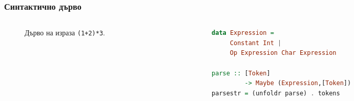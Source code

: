 \documentclass{beamer}
\begin{document}
\begin{frame}[fragile]
  \frametitle{Синтактично дърво}


\begin{columns}[t]
  \begin{column}{0.3\textwidth}

    \begin{figure}
      \centering
      \caption{Дърво на израза \texttt{(1+2)*3}.}
      \label{fig:treeexpr}
      \end{figure}
      

  \end{column}
  \begin{column}{0.7\textwidth}

\begin{lstlisting}[basicstyle=\small,language=Haskell]
data Expression = 
     Constant Int | 
     Op Expression Char Expression

parse :: [Token] 
         -> Maybe (Expression,[Token])     
parsestr = (unfoldr parse) . tokens
\end{lstlisting}

  \end{column}
\end{columns}

\end{frame}  
  
\end{document}
